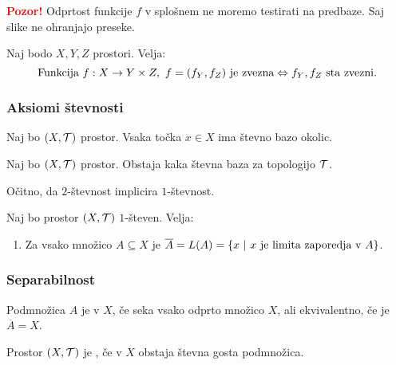 \textbf{\textcolor{red}{Pozor!}} Odprtost funkcije $f$ v splošnem ne moremo testirati na predbaze. Saj slike ne ohranjajo preseke.

\begin{trditev}
    Naj bodo $X, Y, Z$ prostori. Velja:
    $$\text{Funkcija } f:X \to Y \times Z, \ f = (f_Y, f_Z) \text{ je zvezna} \Leftrightarrow f_Y, f_Z \text{ sta zvezni}.$$
\end{trditev}

\subsubsection{Aksiomi števnosti}

\begin{definicija}
    Naj bo $(X, \mathcal{T})$ prostor. Vsaka točka $x \in X$ ima števno bazo okolic.
\end{definicija}

\begin{definicija}
    Naj bo $(X, \mathcal{T})$ prostor. Obstaja kaka števna baza za topologijo $\mathcal{T}$.
\end{definicija}

\begin{opomba}
    Očitno, da $2$-števnost implicira $1$-števnost.
\end{opomba}

\begin{trditev}
    Naj bo prostor $(X, \mathcal{T})$ $1$-števen. Velja:
    \begin{enumerate}
        \item Za vsako množico $A \subseteq X$ je $\overline{A} = L(A) = \left\{x \ | \ x \text{ je limita zaporedja v } A\right\}$.
    \end{enumerate}
\end{trditev}

\subsubsection{Separabilnost}
\begin{definicija}
    Podmnožica $A$ je  v $X$, če seka vsako odprto množico $X$, ali ekvivalentno, če je $\overline{A} = X$.
\end{definicija}

\begin{definicija}
    Prostor $(X, \mathcal{T})$ je , če v $X$ obstaja števna gosta podmnožica.
\end{definicija}

